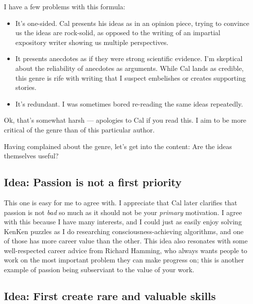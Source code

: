 \documentclass[
]{article}
\providecommand{\tightlist}{%
  \setlength{\itemsep}{0pt}\setlength{\parskip}{0pt}}
\begin{document}
I have a few problems with this formula:

\begin{itemize}
\tightlist
\item
  It's one-sided. Cal presents his ideas as in an opinion piece, trying
  to convince us the ideas are rock-solid, as opposed to the writing of
  an impartial expository writer showing us multiple perspectives.
\item
  It presents anecdotes as if they were strong scientific evidence. I'm
  skeptical about the reliability of anecdotes as arguments. While Cal
  lands as credible, this genre is rife with writing that I suspect
  embelishes or creates supporting stories.
\item
  It's redundant. I was sometimes bored re-reading the same ideas
  repeatedly.
\end{itemize}

Ok, that's somewhat harsh --- apologies to Cal if you read this. I aim
to be more critical of the genre than of this particular author.

Having complained about the genre, let's get into the content: Are the
ideas themselves useful?

\hypertarget{idea-passion-is-not-a-first-priority}{%
\subsection{Idea: Passion is not a first
priority}\label{idea-passion-is-not-a-first-priority}}

This one is easy for me to agree with. I appreciate that Cal later
clarifies that passion is not \emph{bad} so much as it should not be
your \emph{primary} motivation. I agree with this because I have many
interests, and I could just as easily enjoy solving KenKen puzzles as I
do researching consciousness-achieving algorithms, and one of those has
more career value than the other. This idea also resonates with some
well-respected career advice from Richard Hamming, who always wants
people to work on the most important problem they can make progress on;
this is another example of passion being subserviant to the value of
your work.

\hypertarget{idea-first-create-rare-and-valuable-skills}{%
\subsection{Idea: First create rare and valuable
skills}\label{idea-first-create-rare-and-valuable-skills}}
\end{document}
